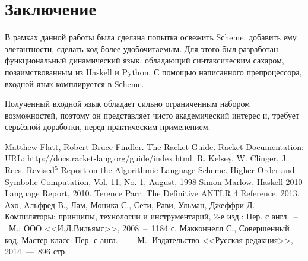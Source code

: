 \documentclass[12pt,a4paper,oneside]{extarticle}
\begin{document}
\clearpage

\section{Заключение}
    В рамках данной работы была сделана попытка освежить Sсheme, добавить ему элегантности, сделать код более удобочитаемым.
    Для этого был разработан функциональный динамический язык, обладающий синтаксическим сахаром, позаимствованным из Haskell и Python.
    С помощью написанного препроцессора, входной язык комплируется в Sсheme.

    Полученный входной язык обладает сильно ограниченным набором возможностей, поэтому он представляет чисто академический интерес и, требует серьёзной доработки, перед практическим применением.
\clearpage

\begin{thebibliography}{0}
     Matthew Flatt, Robert Bruce Findler. The Racket Guide. Racket Documentation: URL: http://docs.racket-lang.org/guide/index.html.
     R. Kelsey, W. Clinger, J. Rees. Revised$^5$ Report on the Algorithmic Language Scheme. Higher-Order and Symbolic Computation, Vol. 11, No. 1, August, 1998
     Simon Marlow. Haskell 2010 Language Report, 2010.
     Terence Parr. The Definitive ANTLR 4 Reference. 2013.
     Ахо, Альфред В., Лам, Моника С., Сети, Рави, Ульман, Джеффри Д. Компиляторы: принципы, технологии и инструментарий, 2-е изд.: Пер. с англ.~--~М.: ООО <<И.Д.Вильямс>>, 2008~--~1184 с.
     Макконнелл С., Совершенный код. Мастер-класс: Пер. с англ.~---~ М.: Издательство <<Русская редакция>>, 2014~---~896 стр.        
\end{thebibliography}
\end{document}
